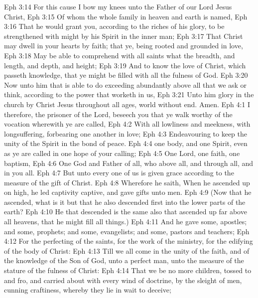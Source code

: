 \vs Eph 3:14 For this cause I bow my knees unto the Father of our Lord Jesus Christ,
\vs Eph 3:15 Of whom the whole family in heaven and earth is named,
\vs Eph 3:16 That he would grant you, according to the riches of his glory, to be strengthened with might by his Spirit in the inner man;
\vs Eph 3:17 That Christ may dwell in your hearts by faith; that ye, being rooted and grounded in love,
\vs Eph 3:18 May be able to comprehend with all saints what  the breadth, and length, and depth, and height;
\vs Eph 3:19 And to know the love of Christ, which passeth knowledge, that ye might be filled with all the fulness of God.
\vs Eph 3:20 Now unto him that is able to do exceeding abundantly above all that we ask or think, according to the power that worketh in us,
\vs Eph 3:21 Unto him  glory in the church by Christ Jesus throughout all ages, world without end. Amen.
\vs Eph 4:1 I therefore, the prisoner of the Lord, beseech you that ye walk worthy of the vocation wherewith ye are called,
\vs Eph 4:2 With all lowliness and meekness, with longsuffering, forbearing one another in love;
\vs Eph 4:3 Endeavouring to keep the unity of the Spirit in the bond of peace.
\vs Eph 4:4  one body, and one Spirit, even as ye are called in one hope of your calling;
\vs Eph 4:5 One Lord, one faith, one baptism,
\vs Eph 4:6 One God and Father of all, who  above all, and through all, and in you all.
\vs Eph 4:7 But unto every one of us is given grace according to the measure of the gift of Christ.
\vs Eph 4:8 Wherefore he saith, When he ascended up on high, he led captivity captive, and gave gifts unto men.
\vs Eph 4:9 (Now that he ascended, what is it but that he also descended first into the lower parts of the earth?
\vs Eph 4:10 He that descended is the same also that ascended up far above all heavens, that he might fill all things.)
\vs Eph 4:11 And he gave some, apostles; and some, prophets; and some, evangelists; and some, pastors and teachers;
\vs Eph 4:12 For the perfecting of the saints, for the work of the ministry, for the edifying of the body of Christ:
\vs Eph 4:13 Till we all come in the unity of the faith, and of the knowledge of the Son of God, unto a perfect man, unto the measure of the stature of the fulness of Christ:
\vs Eph 4:14 That we  be no more children, tossed to and fro, and carried about with every wind of doctrine, by the sleight of men,  cunning craftiness, whereby they lie in wait to deceive;
